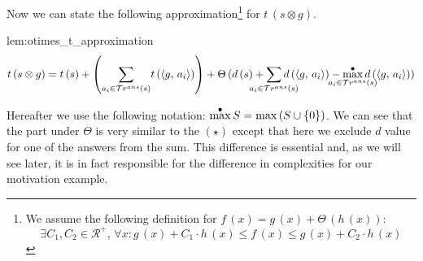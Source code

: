 
Now we can state the following approximation\footnote{We assume the following definition for
$f\,(x) = g\,(x) + \Theta\,(h\,(x))$: \[\exists C_1, C_2 \in \mathcal{R^{+}}, \, \forall x : g\,(x) + C_1 \cdot h\,(x) \le f\,(x) \le g\,(x) + C_2 \cdot h\,(x) \]}
for $t\,(s \otimes g)$.

\begin{replemma}{lem:otimes_t_approximation}
\[
 t\,(s \otimes g)  =  t\,(s) + \left({\sum\limits_{a_i \in \tra{s}}} t\,(\taskst{g}{a_i})\right) +
 \Theta\,(d\,(s) + \smashoperator[lr]{\sum\limits_{a_i \in \tra{s}}} d\,(\taskst{g}{a_i}) - \smashoperator{\maxd\limits_{a_i \in \tra{s}}} d\,(\taskst{g}{a_i}))	
\]
\end{replemma}

Hereafter we use the following notation: $\displaystyle{\max^{\bullet}}\, S = \max\,(S\cup\{0\})$.
We can see that the part under $\Theta$ is very similar to the $(\star)$ except that here we exclude $d$ value for one of the answers from the sum.
This difference is essential and, as we will see later, it is in fact responsible for the difference in complexities for our motivation example.
 
